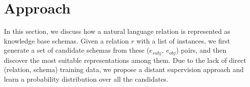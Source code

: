 \section{Approach}
\label{sec:approach}


In this section, we discuss how a natural language relation
is represented as knowledge base schemas.
Given a relation $r$ with a list of instances,
we first generate a set of candidate schemas from these ($e_{subj}$, $e_{obj}$) pairs,
and then discover the most suitable representations among them.
Due to the lack of direct (relation, schema) training data, 
we propose a distant supervision approach and
learn a probability distribution over all the candidates.

%
%
%





%
%
